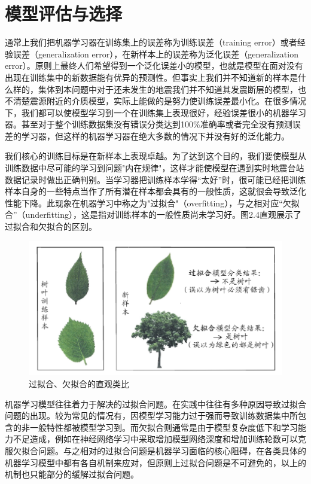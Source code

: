 		
\section{模型评估与选择}

 \indent 通常上我们把机器学习器在训练集上的误差称为训练误差（training error）或者经验误差（generalization error），在新样本上的误差称为泛化误差（generalization error）。原则上最终人们希望得到一个泛化误差小的模型，也就是模型在面对没有出现在训练集中的新数据能有优异的预测性。但事实上我们并不知道新的样本是什么样的，集体到本问题中对于还未发生的地震我们并不知道其发震断层的模型，也不清楚震源附近的介质模型，实际上能做的是努力使训练误差最小化。在很多情况下，我们都可以使模型学习到一个在训练集上表现很好，经验误差很小的机器学习器。甚至对于整个训练数据集没有错误分类达到100\%准确率或者完全没有预测误差的学习器，但这样的机器学习器在绝大多数的情况下并没有好的泛化能力。
 
 \indent 我们核心的训练目标是在新样本上表现卓越。为了达到这个目的，我们要使模型从训练数据中尽可能的学习到问题"内在规律"，这样才能使模型在遇到实时地震台站数据记录时做出正确判别。当学习器把训练样本学得“太好”时，很可能已经把训练样本自身的一些特点当作了所有潜在样本都会具有的一般性质，这就很会导致泛化性能下降。此现象在机器学习中称之为"过拟合"（overfitting），与之相对应“欠拟合”（underfitting），这是指对训练样本的一般性质尚未学习好。图2.4直观展示了过拟合和欠拟合的区别。
 
\begin{figure}[ht]
  \centering
  \includegraphics[width=\linewidth]{img/fitting.jpg}
  \caption{过拟合、欠拟合的直观类比}\label{fig:yinglimoxin}
\end{figure}

 \indent 机器学习模型往往着力于解决的过拟合问题。在实践中往往有多种原因导致过拟合问题的出现。较为常见的情况有，因模型学习能力过于强而导致训练数据集中所包含的非一般特性都被模型学习到。而欠拟合则通常是由于模型复杂度低下和学习能力不足造成，例如在神经网络学习中采取增加模型网络深度和增加训练轮数可以克服欠拟合问题。与之相对的过拟合问题是机器学习面临的核心阻碍，在各类具体的机器学习模型中都有各自机制来应对，但原则上过拟合问题是不可避免的，以上的机制也只能部分的缓解过拟合问题。
 
